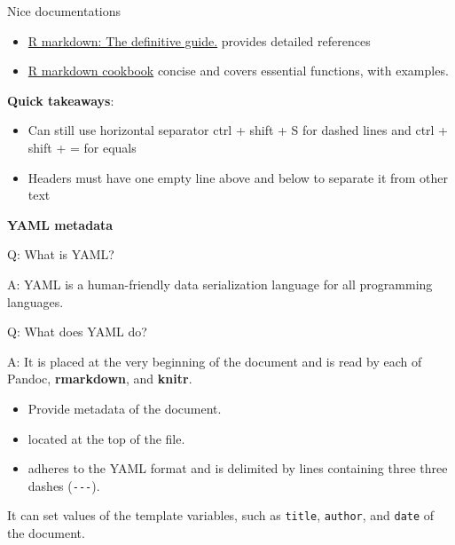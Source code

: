 \documentclass[
]{book}
\providecommand{\tightlist}{%
  \setlength{\itemsep}{0pt}\setlength{\parskip}{0pt}}
\begin{document}
Nice documentations

\begin{itemize}
\tightlist
\item
  \href{https://bookdown.org/yihui/rmarkdown}{R markdown: The definitive guide.} provides detailed references
\item
  \href{https://bookdown.org/yihui/rmarkdown-cookbook/}{R markdown cookbook} concise and covers essential functions, with examples.
\end{itemize}

\textbf{Quick takeaways}:

\begin{itemize}
\tightlist
\item
  Can still use horizontal separator ctrl + shift + S for dashed lines and ctrl + shift + = for equals
\item
  Headers must have one empty line above and below to separate it from other text
\end{itemize}

\textbf{YAML metadata}

Q: What is YAML?

A: YAML is a human-friendly data serialization language for all programming languages.

Q: What does YAML do?

A: It is placed at the very beginning of the document and is read by each of Pandoc, \textbf{rmarkdown}, and \textbf{knitr}.

\begin{itemize}
\tightlist
\item
  Provide metadata of the document.
\item
  located at the top of the file.
\item
  adheres to the YAML format and is delimited by lines containing three three dashes (\texttt{-\/-\/-}).
\end{itemize}

It can set values of the template variables, such as \texttt{title}, \texttt{author}, and \texttt{date} of the document.
\end{document}
